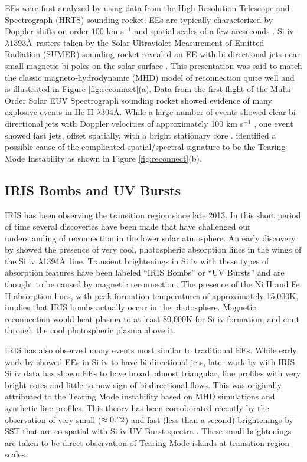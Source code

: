 \documentclass[]{aastex6}
\begin{document}
	
	EEs were first analyzed by \citet{Brueckner1983} using data from the High Resolution Telescope and Spectrograph (HRTS) sounding rocket. EEs are typically characterized by Doppler shifts on order $100$ km s$^{-1}$ and spatial scales of a few arcseconds \citep{Dere1989,Dere1994}.  Si {\sc iv} $\lambda 1393$\AA\ rasters taken by the Solar Ultraviolet Measurement of Emitted Radiation (SUMER) sounding rocket revealed an EE with bi-directional jets near small magnetic bi-poles on the solar surface \citep{Innes1997}.  This presentation was said to match the classic magneto-hydrodynamic (MHD) model of reconnection \citep{Petschek1964} quite well and is illustrated in Figure \ref{fig:reconnect}(a). Data from the first flight of the Multi-Order Solar EUV Spectrograph \citep[MOSES;][]{Fox2010} sounding rocket showed evidence of many explosive events in He II $\lambda$304\AA. While a large number of events showed clear bi-directional jets with Doppler velocities of approximately 100 km s$^{-1}$ \citep{Rust2017}, one event showed fast jets, offset spatially, with a bright stationary core \citep{Fox2010}.  \citet{Fox2010} identified a possible cause of the complicated spatial/spectral signature to be the Tearing Mode Instability \citep{Furth1963} as shown in Figure \ref{fig:reconnect}(b).
	
	\subsection{IRIS Bombs and UV Bursts}
	IRIS has been observing the transition region since late 2013.  In this short period of time several discoveries have been made that have challenged our understanding of reconnection in the lower solar atmosphere.  An early discovery by \citet{Peter2014} showed the presence of very cool, photospheric absorption lines in the wings of the Si {\sc iv} $\lambda$1394\AA\ line. Transient brightenings in Si {\sc iv} with these types of absorption features have been labeled ``IRIS Bombs'' or ``UV Bursts'' and are thought to be caused by magnetic reconnection. The presence of the Ni II and Fe II absorption lines, with peak formation temperatures of approximately 15,000K, implies that IRIS bombs actually occur in the photosphere.  Magnetic reconnection would heat plasma to at least 80,000K for Si {\sc iv} formation, and emit through the cool photospheric plasma above it.
	
	IRIS has also observed many events most similar to traditional EEs.  While early work by \citet{Innes1997} showed EEs in Si {\sc iv} to have bi-directional jets, later work by \citet{Innes2015} with IRIS Si {\sc iv} data has shown EEs to have broad, almost triangular, line profiles with very bright cores and little to now sign of bi-directional flows.  This was originally attributed to the Tearing Mode instability based on MHD simulations and synthetic line profiles. This theory has been corroborated recently by the observation of very small ($\approx 0."2$) and fast (less than a second) brightenings by SST that are co-spatial with Si {\sc iv} UV Burst spectra \citep{Rouppe2017}.  These small brightenings are taken to be direct observation of Tearing Mode islands at transition region scales.
	
\end{document}
